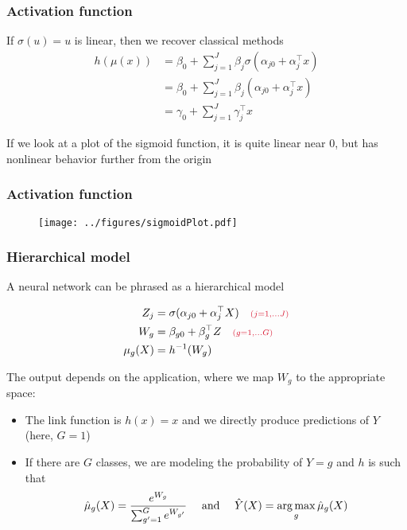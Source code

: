 \documentclass[12pt]{beamer}
\newcommand{\parenthetical}[2]{#1  \scriptstyle \alr{( #2)}}
\begin{document}
\begin{frame}[fragile]
\frametitle{Activation function}
If $\sigma(u) = u$ is linear, then we recover classical methods
\begin{align*}
h(\mu(x)) 
& = 
\beta_0 + \sum_{j=1}^J \beta_j \sigma(\alpha_{j0} + \alpha_j^{\top}x) \\
& =  \beta_0 + \sum_{j=1}^J \beta_j( \alpha_{j0} + \alpha_j^{\top}x)\\
&  = \gamma_0 + \sum_{j=1}^J \gamma_j^{\top}x
\end{align*}

If we look at a plot of the sigmoid function, it is quite linear near 0, but has nonlinear behavior further from the origin
\end{frame}

\begin{frame}[fragile]
\frametitle{Activation function}
\begin{figure}
\centering
\texttt{[image: ../figures/sigmoidPlot.pdf]}
\end{figure}
\end{frame}

\begin{frame}[fragile]
\frametitle{Hierarchical model}
A neural network can be phrased as a hierarchical model

\begin{align*}
Z_j   & = \sigma(\alpha_{j0} + \alpha_j^{\top}X) \parenthetical{\quad}{j = 1, \ldots J} \\
W_g & = \beta_{g0} + \beta_g^{\top}Z \parenthetical{\quad}{g = 1, \ldots G} \\
\mu_g(X) & = h^{-1}(W_g)
\end{align*}

The output depends on the application, where we map $W_g$ to the appropriate space:

\begin{itemize}
\item {} The link function is $h(x) = x$ and we directly produce predictions of $Y$
(here, $G=1$)
\item {} If there are $G$ classes, we are modeling the probability of $Y = g$ and $h$
is such that
\[
 \hat{\mu}_g(X) = \frac{e^{W_g}}{\sum_{g'=1}^Ge^{W_{g'}}} \quad \textrm{ and } \quad \hat{Y}(X) = \operatorname*{arg\,max}_g \hat{\mu}_g(X)
\]
\end{itemize}
\end{frame}
\end{document}
